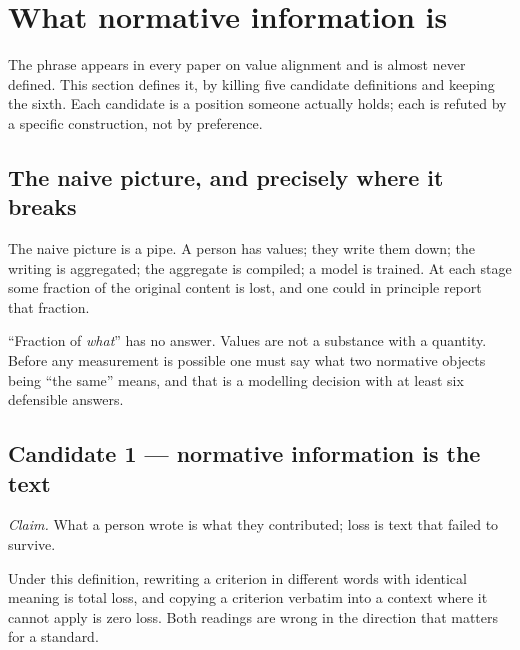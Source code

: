 \section{What normative information is}
\label{sec:concept}

The phrase appears in every paper on value alignment and is almost never defined.
This section defines it, by killing five candidate definitions and keeping the
sixth. Each candidate is a position someone actually holds; each is refuted by a
specific construction, not by preference.

\subsection{The naive picture, and precisely where it breaks}

The naive picture is a pipe. A person has values; they write them down; the
writing is aggregated; the aggregate is compiled; a model is trained. At each
stage some fraction of the original content is lost, and one could in principle
report that fraction.

 ``Fraction of \emph{what}'' has no answer. Values are not
a substance with a quantity. Before any measurement is possible one must say what
two normative objects being ``the same'' means, and that is a modelling decision
with at least six defensible answers.

\subsection{Candidate 1 --- normative information is the text}

\emph{Claim.} What a person wrote is what they contributed; loss is text that
failed to survive.

\begin{proposition}
Under this definition, rewriting a criterion in different words with identical
meaning is total loss, and copying a criterion verbatim into a context where it
cannot apply is zero loss. Both readings are wrong in the direction that matters
for a standard.
\end{proposition}


